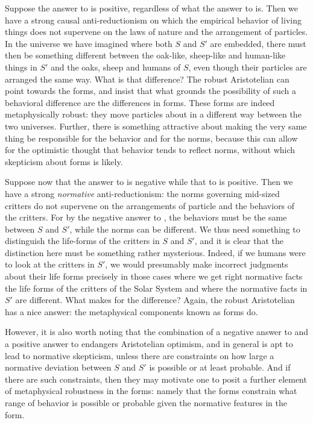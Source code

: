 Suppose the answer to  is positive, regardless of what the answer to  is. Then we have a strong causal anti-reductionism on which the empirical behavior of living
things does not supervene on the laws of nature and the arrangement of particles. In the universe we have imagined
where both $S$ and $S'$ are embedded, there must then be something different between the oak-like, sheep-like
and human-like things in $S'$ and the oaks, sheep and humans of $S$, even though their particles are arranged the
same way. What is that difference? The robust Aristotelian can point towards the forms, and insist that what grounds
the possibility of such a behavioral difference are the differences in forms. These forms are indeed metaphysically
robust: they move particles about in a different way between the two universes. Further, there is something attractive 
about making the very same thing be responsible for the behavior and for the norms, because this can allow for
the optimistic thought that behavior tends to reflect norms, without which skepticism about forms is likely.

Suppose now that the answer to  is negative while that to  is positive. Then  
we have a strong \textit{normative} anti-reductionism: the norms governing mid-sized critters do not supervene 
on the arrangements of particle and the behaviors of the critters. For by the negative answer to ,
the behaviors must be the same between $S$ and $S'$, while the norms can be different. We thus need something
to distinguish the life-forms of the critters in $S$ and $S'$, and it is clear that the distinction here must
be something rather mysterious. Indeed, if we humans were to look at the critters in $S'$, we would presumably
make incorrect judgments about their life forms precisely in those cases where we get right normative facts
the life forms of the critters of the Solar System and where the normative facts in $S'$ are different. What
makes for the difference? Again, the robust Aristotelian has a nice answer: the metaphysical components known
as forms do.

However, it is also worth noting
that the combination of a negative answer to  and a positive answer to  endangers
Aristotelian optimism, and in general is apt to lead to normative skepticism, unless there are constraints
on how large a normative deviation between $S$ and $S'$ is possible or at least probable. And if there are
such constraints, then they may motivate one to posit a further element of metaphysical robustness in the forms:
namely that the forms constrain what range of behavior is possible or probable given the normative features in
the form.

